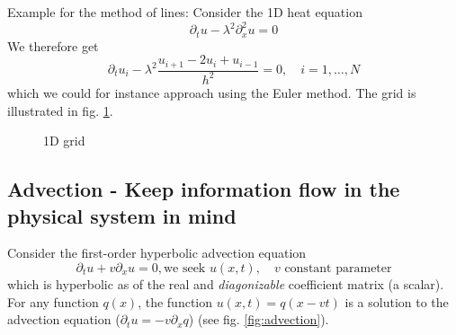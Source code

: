 \textcolor{blue1}{Example for the method of lines: } Consider the 1D heat equation
\begin{equation}
    \partial_t u - \lambda^2 \partial_x^2 u = 0
\end{equation}
We therefore get
\begin{equation}
    \partial_t u_i - \lambda^2 \frac{u_{i+1} - 2u_i + u_{i-1}}{h^2} = 0, \quad i = 1, \dots, N
\end{equation}
which we could for instance approach using the Euler method. The grid is illustrated in fig. \ref{fig:method_of_lines_grid}.
\begin{figure}[htb!]
    \centering
    
    \caption{1D grid}
    \label{fig:method_of_lines_grid}
\end{figure}


\subsection{Advection - Keep information flow in the physical system in mind}
Consider the first-order hyperbolic advection equation
\begin{equation}
    \partial_t u + v \partial_x u = 0, \text{we seek } u(x,t), \quad v \text{ constant parameter}
\end{equation}
which is hyperbolic as of the real and \textit{diagonizable} coefficient matrix (a scalar).
For any function $q(x)$, the function $u(x,t) = q(x-vt)$ is a solution to the advection equation ($\partial_t u = -v \partial_x q$) (see fig. \ref{fig:advection}).

